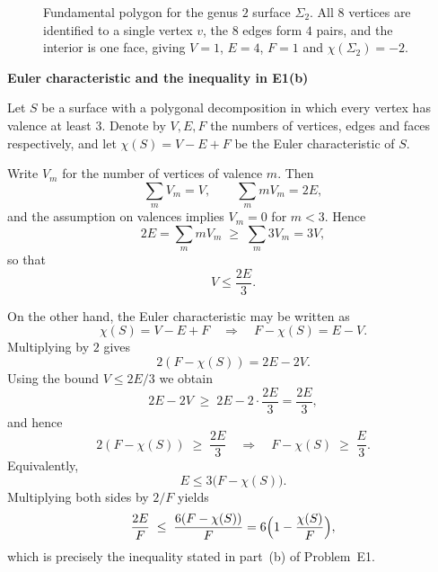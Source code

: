 \begin{problem}
\begin{figure}[htbp]
		\caption{Fundamental polygon for the genus $2$ surface $\Sigma_2$.
			All $8$ vertices are identified to a single vertex $v$, the $8$ edges form
			$4$ pairs, and the interior is one face, giving $V=1$, $E=4$, $F=1$ and
			$\chi(\Sigma_2) = -2$.}
		\label{fig:double-torus-fundamental}
	\end{figure}
	
	\par\medskip\noindent\textbf{Euler characteristic and the inequality in E1(b)}\par\smallskip

	
	Let $S$ be a surface with a polygonal decomposition in which every vertex
	has valence at least $3$.  Denote by $V,E,F$ the numbers of vertices,
	edges and faces respectively, and let $\chi(S) = V - E + F$ be the Euler
	characteristic of $S$.
	
	Write $V_m$ for the number of vertices of valence $m$.  Then
	\[
	\sum_m V_m = V,
	\qquad
	\sum_m mV_m = 2E,
	\]
	and the assumption on valences implies $V_m=0$ for $m<3$.  Hence
	\[
	2E = \sum_m mV_m \;\ge\; \sum_m 3V_m = 3V,
	\]
	so that
	\[
	V \le \frac{2E}{3}.
	\]
	
	On the other hand, the Euler characteristic may be written as
	\[
	\chi(S) = V - E + F
	\quad\Longrightarrow\quad
	F - \chi(S) = E - V.
	\]
	Multiplying by $2$ gives
	\[
	2(F - \chi(S)) = 2E - 2V.
	\]
	Using the bound $V \le 2E/3$ we obtain
	\[
	2E - 2V \;\ge\; 2E - 2\cdot\frac{2E}{3}
	= \frac{2E}{3},
	\]
	and hence
	\[
	2(F - \chi(S)) \;\ge\; \frac{2E}{3}
	\quad\Longrightarrow\quad
	F - \chi(S) \;\ge\; \frac{E}{3}.
	\]
	Equivalently,
	\[
	E \le 3\bigl(F - \chi(S)\bigr).
	\]
	Multiplying both sides by $2/F$ yields
	\[
	\frac{2E}{F} \;\le\;
	\frac{6(F - \chi(S))}{F}
	= 6\Bigl(1 - \frac{\chi(S)}{F}\Bigr),
	\]
	which is precisely the inequality stated in part~(b) of Problem~E1.
	

\end{problem}
